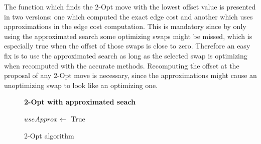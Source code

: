 The function which finds the 2-Opt move with the lowest offset value is presented in two versions: one which computed the exact edge cost and another which uses approximations in the edge cost computation.
This is mandatory since by only using the approximated search some optimizing swaps might be missed, which is especially true when the offset of those swaps is close to zero.
Therefore an easy fix is to use the approximated search as long as the selected swap is optimizing when recomputed with the accurate methods.
Recomputing the offset at the proposal of any 2-Opt move is necessary, since the approximations might cause an unoptimizing swap to look like an optimizing one.

\begin{figure}[htbp]
    \textbf{2-Opt with approximated seach} \\
    \begin{algorithm}[H]
        \BlankLine
        $useApprox \gets$ True \\
    \end{algorithm}
    \caption{2-Opt algorithm} \label{fig:2OptPseudocodeApprox}
\end{figure}


